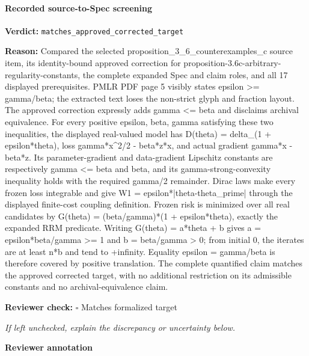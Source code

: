 \documentclass[10pt]{article}
\newcommand{\reviewerbox}{%
  \par\noindent\fbox{\parbox{0.96\linewidth}{\rule{0pt}{0.38in}}}\par
}
\newcommand{\reviewmatch}[1]{%
  \par\noindent\textbf{Reviewer check:} $\square$\; #1\par
  \noindent\emph{If left unchecked, explain the discrepancy or uncertainty below.}\par
}
\begin{document}
\paragraph{Recorded source-to-Spec screening}
\textbf{Verdict:} \texttt{matches\_approved\_corrected\_target}
\\
{\raggedright
\textbf{Reason:} Compared the selected proposition\_\allowbreak{}3\_\allowbreak{}6\_\allowbreak{}counterexamples\_\allowbreak{}c source item, its identity-\allowbreak{}bound approved correction for proposition-\allowbreak{}3.\allowbreak{}6c-\allowbreak{}arbitrary-\allowbreak{}regularity-\allowbreak{}constants, the complete expanded Spec and claim roles, and all 17 displayed prerequisites.\allowbreak{} PMLR PDF page 5 visibly states epsilon >= gamma/\allowbreak{}beta;\allowbreak{} the extracted text loses the non-\allowbreak{}strict glyph and fraction layout.\allowbreak{} The approved correction expressly adds gamma <= beta and disclaims archival equivalence.\allowbreak{} For every positive epsilon, beta, gamma satisfying these two inequalities, the displayed real-\allowbreak{}valued model has D(theta) = delta\_\allowbreak{}(1 + epsilon*theta), loss gamma*x\textasciicircum{}2/\allowbreak{}2 -\allowbreak{} beta*z*x, and actual gradient gamma*x -\allowbreak{} beta*z.\allowbreak{} Its parameter-\allowbreak{}gradient and data-\allowbreak{}gradient Lipschitz constants are respectively gamma <= beta and beta, and its gamma-\allowbreak{}strong-\allowbreak{}convexity inequality holds with the required gamma/\allowbreak{}2 remainder.\allowbreak{} Dirac laws make every frozen loss integrable and give W1 = epsilon*|theta-\allowbreak{}theta\_\allowbreak{}prime| through the displayed finite-\allowbreak{}cost coupling definition.\allowbreak{} Frozen risk is minimized over all real candidates by G(theta) = (beta/\allowbreak{}gamma)*(1 + epsilon*theta), exactly the expanded RRM predicate.\allowbreak{} Writing G(theta) = a*theta + b gives a = epsilon*beta/\allowbreak{}gamma >= 1 and b = beta/\allowbreak{}gamma > 0;\allowbreak{} from initial 0, the iterates are at least n*b and tend to +infinity.\allowbreak{} Equality epsilon = gamma/\allowbreak{}beta is therefore covered by positive translation.\allowbreak{} The complete quantified claim matches the approved corrected target, with no additional restriction on its admissible constants and no archival-\allowbreak{}equivalence claim.\allowbreak{}
\par}
\reviewmatch{Matches formalized target}
\noindent\textbf{Reviewer annotation}\par
\reviewerbox
\clearpage
\hypertarget{source-claim-3c3f5f67ec925541}{}
\end{document}

